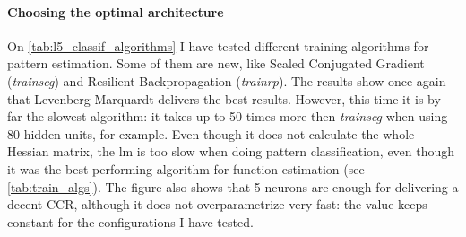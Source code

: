 \documentclass[a4paper, 10pt]{article}
\begin{document}
  \paragraph{Choosing the optimal architecture} On 
  \autoref{tab:l5_classif_algorithms} I have tested different training algorithms
  for pattern estimation. Some of them are new, like Scaled Conjugated Gradient
  (\emph{trainscg}) and Resilient Backpropagation (\emph{trainrp}). The results
  show once again that Levenberg-Marquardt delivers the best results. However,
  this time it is by far the slowest algorithm: it takes up to 50 times more
  then \emph{trainscg} when using 80 hidden units, for example. Even though
  it does not calculate the whole Hessian matrix, the lm is too slow
  when doing pattern classification, even though it was the best performing
  algorithm for function estimation (see \autoref{tab:train_algs}).
  The figure also shows that 5 neurons are
  enough for delivering a decent CCR, although it does not overparametrize very
  fast: the value keeps constant for the configurations I have tested.

  \begin{table}[htb]
  \caption{Comparing different units on the hidden layer and training methods for
  the feedforward \emph{patternnet} on the white wine dataset. This time, the
most accurate algorithm is not the fastest; quite the opposite. \emph{CCR} stands
for Correctly Classfied Data on the validation set, and \emph{Epch} for epoch 
of convergence in the training phase. Validation and test set are each 15\% of
the data points.}  
  \label{tab:l5_classif_algorithms}
  \end{table}
\end{document}
